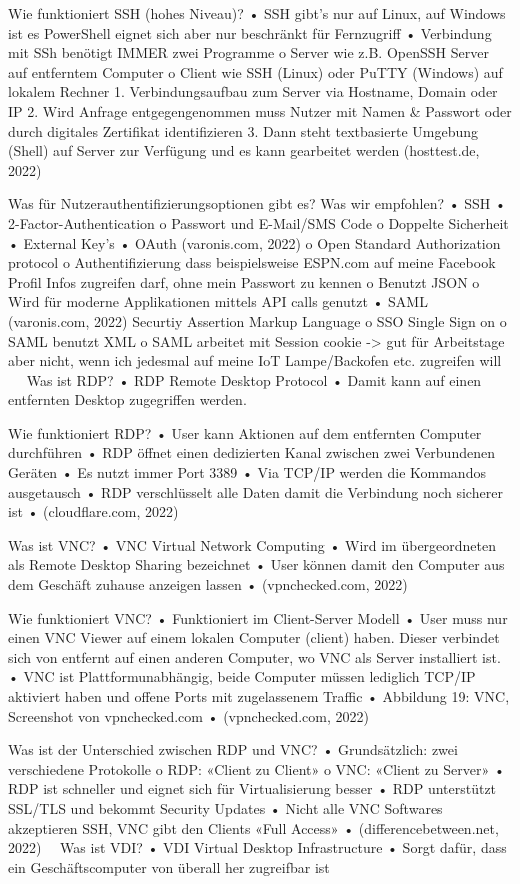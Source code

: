 \begin{itemize}
Wie funktioniert SSH (hohes Niveau)?
•	SSH gibt’s nur auf Linux, auf Windows ist es PowerShell eignet sich aber nur beschränkt für Fernzugriff
•	Verbindung mit SSh benötigt IMMER zwei Programme
o	Server wie z.B. OpenSSH Server auf entferntem Computer
o	Client wie SSH (Linux) oder PuTTY (Windows) auf lokalem Rechner
1.	Verbindungsaufbau zum Server via Hostname, Domain oder IP 
2.	Wird Anfrage entgegengenommen muss Nutzer mit Namen & Passwort oder durch digitales Zertifikat identifizieren
3.	Dann steht textbasierte Umgebung (Shell) auf Server zur Verfügung und es kann gearbeitet werden (hosttest.de, 2022)

Was für Nutzerauthentifizierungsoptionen gibt es? Was wir empfohlen?
•	SSH
•	2-Factor-Authentication
o	Passwort und E-Mail/SMS Code
o	Doppelte Sicherheit
•	External Key’s
•	OAuth (varonis.com, 2022)
o	Open Standard Authorization protocol
o	Authentifizierung dass beispielsweise ESPN.com auf meine Facebook Profil Infos zugreifen darf, ohne mein Passwort zu kennen
o	Benutzt JSON
o	Wird für moderne Applikationen mittels API calls genutzt
•	SAML (varonis.com, 2022) Securtiy Assertion Markup Language
o	SSO Single Sign on
o	SAML benutzt XML
o	SAML arbeitet mit Session cookie -> gut für Arbeitstage aber nicht, wenn ich jedesmal auf meine IoT Lampe/Backofen etc. zugreifen will
 
Was ist RDP?
•	RDP Remote Desktop Protocol
•	Damit kann auf einen entfernten Desktop zugegriffen werden.

Wie funktioniert RDP?
•	User kann Aktionen auf dem entfernten Computer durchführen
•	RDP öffnet einen dedizierten Kanal zwischen zwei Verbundenen Geräten
•	Es nutzt immer Port 3389
•	Via TCP/IP werden die Kommandos ausgetausch
•	RDP verschlüsselt alle Daten damit die Verbindung noch sicherer ist
•	(cloudflare.com, 2022)

Was ist VNC?
•	VNC Virtual Network Computing
•	Wird im übergeordneten als Remote Desktop Sharing bezeichnet
•	User können damit den Computer aus dem Geschäft zuhause anzeigen lassen
•	(vpnchecked.com, 2022)

Wie funktioniert VNC?
•	Funktioniert im Client-Server Modell
•	User muss nur einen VNC Viewer auf einem lokalen Computer (client) haben. Dieser verbindet sich von entfernt auf einen anderen Computer, wo VNC als Server installiert ist. 
•	VNC ist Plattformunabhängig, beide Computer müssen lediglich TCP/IP aktiviert haben und offene Ports mit zugelassenem Traffic
•	 
Abbildung 19: VNC, Screenshot von vpnchecked.com
•	(vpnchecked.com, 2022)

Was ist der Unterschied zwischen RDP und VNC? 
•	Grundsätzlich: zwei verschiedene Protokolle
o	RDP: «Client zu Client»
o	VNC: «Client zu Server»
•	RDP ist schneller und eignet sich für Virtualisierung besser
•	RDP unterstützt SSL/TLS und bekommt Security Updates
•	Nicht alle VNC Softwares akzeptieren SSH, VNC gibt den Clients «Full Access»
•	(differencebetween.net, 2022) 
Was ist VDI?
•	VDI Virtual Desktop Infrastructure
•	Sorgt dafür, dass ein Geschäftscomputer von überall her zugreifbar ist


\end{itemize}
